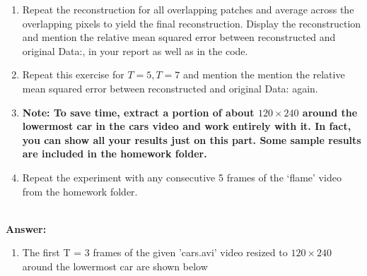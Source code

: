 \documentclass[12pt]{article}
\begin{document}
\begin{itemize}
\begin{enumerate}
\item Repeat the reconstruction for all overlapping patches and average across the overlapping pixels to yield the final reconstruction. Display the reconstruction and mention the relative mean squared error between reconstructed and original Data:, in your report as well as in the code. 
\item Repeat this exercise for $T = 5, T = 7$ and mention the mention the relative mean squared error between reconstructed and original Data: again.
\item \textbf{Note: To save time, extract a portion of about $120 \times 240$ around the lowermost car in the cars video and work entirely with it. In fact, you can show all your results just on this part. Some sample results are included in the homework folder.}
\item Repeat the experiment with any consecutive 5 frames of the `flame' video from the homework folder.
\end{enumerate}
\vspace*{0.5cm}\\
\textbf{Answer:} \\
\begin{enumerate}
    \item The first T = 3 frames of the given 'cars.avi' video resized to $120 \times 240$ around the lowermost car are shown below
    

\end{enumerate}
\end{itemize}
\end{document}
